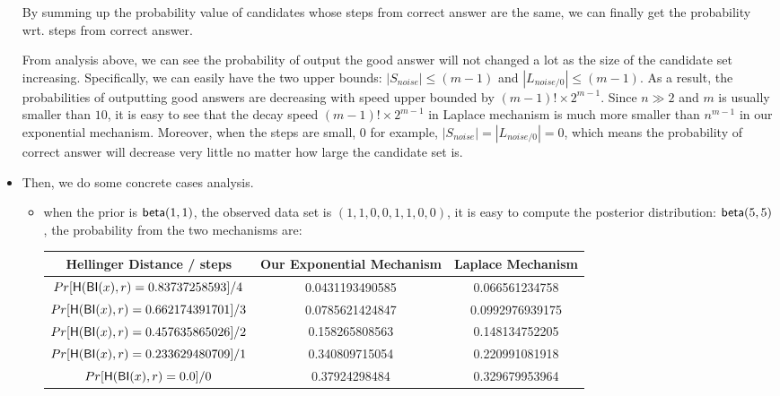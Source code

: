 \begin{itemize}
	By summing up the probability value of candidates whose steps from correct answer are the same, we can finally get the probability wrt. steps from correct answer.

	From analysis above, we can see the probability of output the good answer will not changed a lot as the size of the candidate set increasing. Specifically, we can easily have the two upper bounds: $|S_{noise}| \leq (m-1)$ and $|L_{noise/0}| \leq (m-1)$. As a result, the probabilities of outputting good answers are decreasing with speed upper bounded by $(m-1)! \times 2^{m-1}$. Since $n \gg 2$ and $m$ is usually smaller than $10$, it is easy to see that the decay speed $(m-1)! \times 2^{m-1}$ in Laplace mechanism is much more smaller than $n^{m-1}$ in our exponential mechanism. Moreover, when the steps are small, $0$ for example, $|S_{noise}| = |L_{noise/0}|  = 0$, which means the probability of correct answer will decrease very little no matter how large the candidate set is. 

	\item Then, we do some concrete cases analysis.

	\begin{itemize}
		\item when the prior is $\mathsf{beta}(1,1)$, the observed data set is $(1,1,0,0,1,1,0,0)$, it is easy to compute the posterior distribution: $\mathsf{beta}(5,5)$, the probability from the two mechanisms are: 

		\begin{center}
		 \begin{tabular}{c | c | c} 
		 \hline
		 Hellinger Distance / steps & Our Exponential Mechanism & Laplace Mechanism  \\
		 \hline\hline
		 $Pr[\mathsf{H}(\mathsf{BI}(x), r) = 0.83737258593] / 4		$ & 0.0431193490585 & 0.066561234758\\ 
		 \hline
		 $Pr[\mathsf{H}(\mathsf{BI}(x), r) = 0.662174391701 ] / 3	$ & 0.0785621424847 & 0.0992976939175  \\
		 \hline
		 $Pr[\mathsf{H}(\mathsf{BI}(x), r) = 0.457635865026 ] / 2	$ & 0.158265808563 & 0.148134752205  \\
		 \hline
		 $Pr[\mathsf{H}(\mathsf{BI}(x), r) = 0.233629480709 ] / 1	$ & 0.340809715054 & 0.220991081918  \\
		 \hline
		 $Pr[\mathsf{H}(\mathsf{BI}(x), r) = 0.0 ] / 0 				$ & 0.37924298484 & 0.329679953964 \\
		 \hline
		\end{tabular}
		\end{center}


\end{itemize}
\end{itemize}
